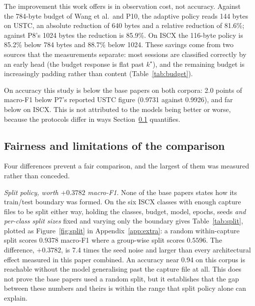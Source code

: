 \documentclass[pdflatex,sn-mathphys-num]{sn-jnl}
\theoremstyle{thmstyleone}%
\theoremstyle{thmstylethree}%
\begin{document}
The improvement this work offers is in observation cost, not accuracy. Against
the 784-byte budget of Wang et al.\ and P10, the adaptive policy reads 144
bytes on USTC, an absolute reduction of 640 bytes and a relative reduction of
81.6\%; against P8's 1024 bytes the reduction is 85.9\%. On
ISCX the 116-byte policy is 85.2\% below 784 bytes and
88.7\% below 1024. These savings come from two sources that the
measurements separate: most sessions are classified correctly by an early head
(the budget response is flat past $k^\star$), and the remaining budget is
increasingly padding rather than content (Table~\ref{tab:budget}).

On accuracy this study is below the base papers on both corpora: 2.0 points of
macro-F1 below P7's reported USTC figure (0.9731 against 0.9926), and far below
on ISCX. This is not attributed
to the models being better or worse, because the protocols differ in ways
Section~\ref{subsec:fairness} quantifies.

\subsection{Fairness and limitations of the comparison}\label{subsec:fairness}

Four differences prevent a fair comparison, and the largest of them was
measured rather than conceded.

\emph{Split policy, worth $+0.3782$ macro-F1.} None of the base papers states
how its train/test boundary was formed. On the six ISCX classes with enough
capture files to be split either way, holding the classes, budget, model,
epochs, seeds \emph{and per-class split sizes} fixed and varying only the
boundary gives Table~\ref{tab:split}, plotted as Figure~\ref{fig:split} in
Appendix~\ref{app:extra}: a random within-capture split scores
$0.9378$ macro-F1 where a group-wise split scores $0.5596$. The difference,
$+0.3782$, is 7.4 times the seed noise and larger than every architectural
effect measured in this paper combined. An accuracy near 0.94 on this corpus is
reachable without the model generalising past the capture file at all. This
does not prove the base papers used a random split, but it establishes that the
gap between these numbers and theirs is within the range that split policy
alone can explain.
\end{document}
